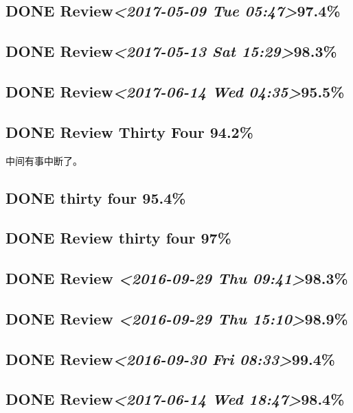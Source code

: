 \documentclass[11pt]{ctexart}
\begin{document}
\subsection{{\bfseries\sffamily DONE} Review\textit{<2017-05-09 Tue 05:47>}97.4\%}
\label{sec:org253b5b4}
\subsection{{\bfseries\sffamily DONE} Review\textit{<2017-05-13 Sat 15:29>}98.3\%}
\label{sec:org907fd7b}
\subsection{{\bfseries\sffamily DONE} Review\textit{<2017-06-14 Wed 04:35>}95.5\%}
\label{sec:org7b88d52}
\subsection{{\bfseries\sffamily DONE} Review Thirty Four 94.2\%}
\label{sec:org3bda3a9}
中间有事中断了。

\subsection{{\bfseries\sffamily DONE} thirty four 95.4\%}
\label{sec:orga5e6701}
\subsection{{\bfseries\sffamily DONE} Review thirty four 97\%}
\label{sec:org0a814b4}
\subsection{{\bfseries\sffamily DONE} Review \textit{<2016-09-29 Thu 09:41>}98.3\%}
\label{sec:org3624eae}
\subsection{{\bfseries\sffamily DONE} Review \textit{<2016-09-29 Thu 15:10>}98.9\%}
\label{sec:orgccbef91}
\subsection{{\bfseries\sffamily DONE} Review\textit{<2016-09-30 Fri 08:33>}99.4\%}
\label{sec:org21ce6e9}
\subsection{{\bfseries\sffamily DONE} Review\textit{<2017-06-14 Wed 18:47>}98.4\%}
\label{sec:org7c84081}
\end{document}
